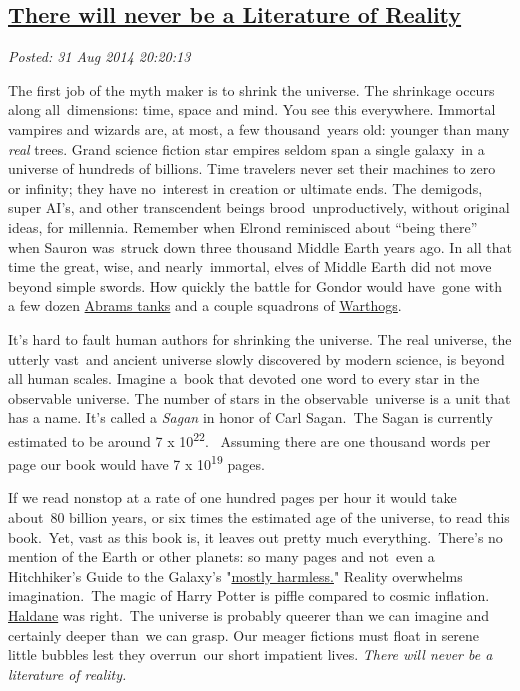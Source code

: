 %

\subsection*{\href{https://bakerjd99.wordpress.com/2014/08/31/there-will-never-be-a-literature-of-reality/}{There will never be a Literature of Reality}}


\noindent\emph{Posted: 31 Aug 2014 20:20:13}
\vspace{6pt}

The first job of the myth maker is to shrink the universe. The shrinkage
occurs along all~dimensions: time, space and mind. You see this
everywhere. Immortal vampires and wizards are, at most, a few
thousand~years old: younger than many \emph{real} trees. Grand science
fiction star empires seldom span a single galaxy~in a universe of
hundreds of billions. Time travelers never set their machines to zero or
infinity; they have no~interest in creation or ultimate ends. The
demigods, super AI's, and other transcendent beings
brood~unproductively, without original ideas, for millennia. Remember
when Elrond reminisced about ``being there'' when Sauron was~struck down
three thousand Middle Earth years ago. In all that time the great, wise,
and nearly~immortal, elves of Middle Earth did not move beyond simple
swords. How quickly the battle for Gondor would have~gone with a few
dozen
\href{http://www.marines.com/operating-forces/equipment/vehicles/m1a1-abrams-tank}{Abrams
tanks} and a couple squadrons of
\href{http://en.wikipedia.org/wiki/Fairchild_Republic_A-10_Thunderbolt_II}{Warthogs}.

It's hard to fault human authors for shrinking the universe. The real
universe, the utterly vast~and ancient universe slowly discovered by
modern science, is beyond all human scales. Imagine a~book that devoted
one word to every star in the observable universe. The number of stars
in the observable~universe is a unit that has a name. It's called a
\emph{Sagan} in honor of Carl Sagan.~The Sagan is currently estimated to
be around 7 x 10\textsuperscript{22}. ~Assuming there are one thousand
words per page our book would have 7 x 10\textsuperscript{19} pages.

If we read nonstop at a rate of one hundred pages per hour it would take
about~80 billion years, or six times the estimated age of the universe,
to read this book.~Yet, vast as this book is, it leaves out pretty much
everything.~There's no mention of the Earth or other planets: so many
pages and not~even a Hitchhiker's Guide to the Galaxy's
"\href{http://en.wikipedia.org/wiki/Mostly_Harmless}{mostly harmless.}"
Reality overwhelms imagination.~The magic of Harry Potter is piffle
compared to cosmic inflation.
\href{http://en.wikiquote.org/wiki/J._B._S._Haldane}{Haldane} was
right.~The universe is probably queerer than we can imagine and
certainly deeper than~we can grasp. Our meager fictions must float in
serene little bubbles lest they overrun~our short impatient lives.
\emph{There will never be a literature of reality.}



%